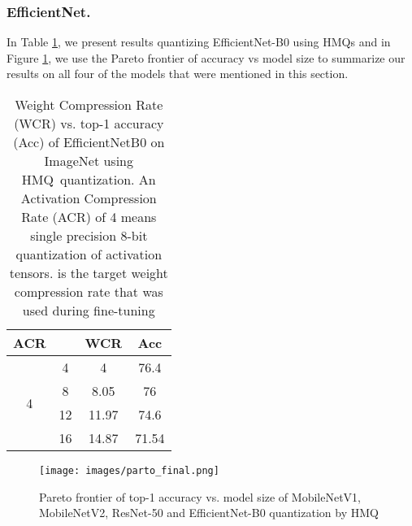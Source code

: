 \documentclass{article}
\newcommand{\qb}{HMQ}
\begin{document}
\subsubsection{EfficientNet.}
In Table \ref{tab:efficientnet_imagenet}, we present results quantizing EfficientNet-B0 using \qb s and in Figure \ref{fig:parto_imagenet}, we use the Pareto frontier of accuracy vs model size to summarize our results on all four of the models that were mentioned in this section. 

\begin{table}[h]
	\centering
	\caption{
		Weight Compression Rate (WCR) vs. top-1 accuracy (Acc) of EfficientNetB0 on ImageNet using \qb\ quantization.
		An Activation Compression Rate (ACR) of 4 means single precision 8-bit quantization of activation tensors.
		 is the target weight compression rate that was used during fine-tuning
	}
	\label{tab:efficientnet_imagenet}
	\begin{tabular}{cccc}
		\hline
		ACR                &  & WCR   & Acc   \\ \hline
		\multirow{4}{*}{4} & 4     & 4     & 76.4  \\
		& 8     & 8.05  & 76    \\
		& 12    & 11.97 & 74.6  \\
		& 16    & 14.87 & 71.54 \\ \hline
	\end{tabular}
\end{table}
\begin{figure}\centering
	\texttt{[image: images/parto\_final.png]}
	\caption{Pareto frontier of top-1 accuracy vs. model size of MobileNetV1, MobileNetV2, ResNet-50 and EfficientNet-B0 quantization by \qb}
	\label{fig:parto_imagenet}
\end{figure}
\end{document}
